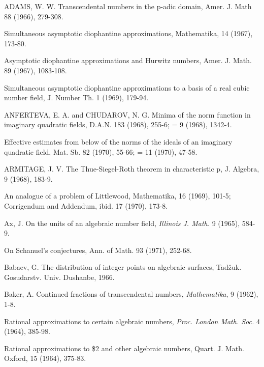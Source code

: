 \begin{hanglist}
    \item ADAMS, W. W. Transcendental numbers in the p-adic domain, Amer. J. Math 88 (1966), 279-308.
    \item Simultaneous asymptotic diophantine approximations, Mathematika, 14 (1967), 173-80.
    \item Asymptotic diophantine approximations and Hurwitz numbers, Amer. J. Math. 89 (1967), 1083-108.
    \item Simultaneous asymptotic diophantine approximations to a basis of a real cubic number field, J. Number Th. 1 (1969), 179-94.
    \item ANFERTEVA, E. A. and CHUDAROV, N. G. Minima of the norm function in imaginary quadratic fields, D.A.N. 183 (1968), 255-6; = 9 (1968), 1342-4.
    \item Effective estimates from below of the norms of the ideals of an imaginary quadratic field, Mat. Sb. 82 (1970), 55-66; = 11 (1970), 47-58.
    \item ARMITAGE, J. V. The Thue-Siegel-Roth theorem in characteristic p, J. Algebra, 9 (1968), 183-9.
    \item An analogue of a problem of Littlewood, Mathematika, 16 (1969), 101-5; Corrigendum and Addendum, ibid. 17 (1970), 173-8.
    \item Ax, J. On the units of an algebraic number field, \textit{Illinois J. Math.} 9 (1965), 584-9.
    \item \hspace{1.5em} On Schanuel's conjectures, Ann. of Math. 93 (1971), 252-68.
    \item Babaev, G. The distribution of integer points on algebraic surfaces, Tadžuk. Gosudarstv. Univ. Dushanbe, 1966.
    \item Baker, A. Continued fractions of transcendental numbers, \textit{Mathematika}, 9 (1962), 1-8.
    \item \hspace{1.5em} Rational approximations to certain algebraic numbers, \textit{Proc. London Math. Soc.} 4 (1964), 385-98.
    \item \hspace{1.5em} Rational approximations to \$2 and other algebraic numbers, Quart. J. Math. Oxford, 15 (1964), 375-83.

\end{hanglist}
